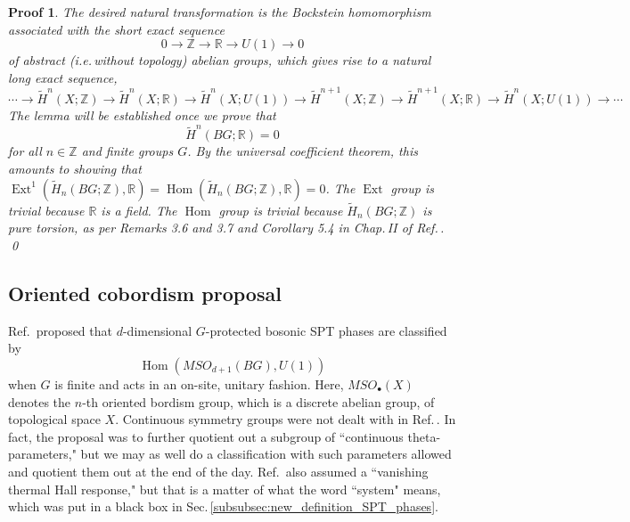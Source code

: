 \documentclass[sort&compress]{elsarticle}
\theoremstyle{theoremstyle}
\theoremstyle{framedtheoremstyle}
\theoremstyle{definitionstyle}
\theoremstyle{definitionstyle}
\theoremstyle{definitionstyle}
\theoremstyle{definitionstyle}
\theoremstyle{nameddefinitionstyle}
\theoremstyle{framednameddefinitionstyle}
\theoremstyle{proofstyle}
\newtheorem{pf}{Proof}
\theoremstyle{definitionstyle}
\newcommand{\fromto}{\rightarrow}
\newcommand{\ZZZ}{\mathbb{Z}}
\newcommand{\RRR}{\mathbb{R}}
\DeclareMathOperator{\Hom}{Hom}
\newcommand{\paren}[1]{\left( #1 \right)}
\DeclareMathOperator{\Ext}{Ext}
\begin{document}
\begin{appendices}
\begin{pf}%
The desired natural transformation is the Bockstein homomorphism associated with the short exact sequence
\begin{equation}
0 \fromto \ZZZ \fromto \RRR \fromto U(1) \fromto 0
\end{equation}
of abstract (i.e.\,without topology) abelian groups, which gives rise to a natural long exact sequence,
\begin{equation}
\cdots
\fromto \widetilde H^n\paren{X;\ZZZ} \fromto \widetilde H^n\paren{X;\RRR} \fromto \widetilde H^n\paren{X;U(1)}
\fromto \widetilde H^{n+1}\paren{X;\ZZZ} \fromto \widetilde H^{n+1}\paren{X;\RRR} \fromto \widetilde H^n\paren{X;U(1)}
\fromto \cdots
\end{equation}
The lemma will be established once we prove that
\begin{equation}
\widetilde H^n\paren{BG;\RRR} = 0
\end{equation}
for all $n\in \ZZZ$ and finite groups $G$. By the universal coefficient theorem, this amounts to showing that $\Ext^1\paren{ \widetilde H_n\paren{BG;\ZZZ}, \RRR } = \Hom\paren{ \widetilde H_n\paren{BG;\ZZZ}, \RRR } = 0$. The $\Ext$ group is trivial because $\RRR$ is a field. The $\Hom$ group is trivial because $\widetilde H_n\paren{BG;\ZZZ}$ is pure torsion, as per Remarks 3.6 and 3.7 and Corollary 5.4 in Chap.\,II of Ref.\,\cite{AdemMilgram}.
\qed\end{pf}






\subsection{Oriented cobordism proposal \label{subapp:oriented_cobordism_proposal}}

Ref.\,\cite{Kapustin_Boson} proposed that $d$-dimensional $G$-protected bosonic SPT phases are classified by
\begin{equation}
\Hom\paren{ MSO_{d+1}\paren{BG} , U(1) } \label{oriented_cobordism_proposal}
\end{equation}
when $G$ is finite and acts in an on-site, unitary fashion. 
Here, $MSO_\bullet\paren{X}$ denotes the $n$-th oriented bordism group, which is a discrete abelian group, of topological space $X$. Continuous symmetry groups were not dealt with in Ref.\,\cite{Kapustin_Boson}. In fact, the proposal was to further quotient out a subgroup of ``continuous theta-parameters," but we may as well do a classification with such parameters allowed and quotient them out at the end of the day. Ref.\,\cite{Kapustin_Boson} also assumed a ``vanishing thermal Hall response," but that is a matter of what the word ``system" means, which was put in a black box in Sec.\,\ref{subsubsec:new_definition_SPT_phases}.


\end{appendices}
\end{document}
